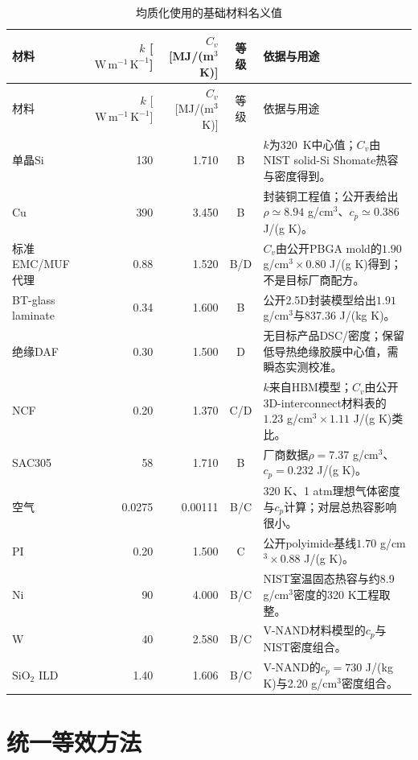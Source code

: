 \documentclass[UTF8,zihao=-4]{ctexart}
\newcommand{\unitk}{\mathrm{W\,m^{-1}\,K^{-1}}}
\begin{document}
\begingroup
\small
\setlength{\tabcolsep}{3pt}
\begin{longtable}{@{}p{2.2cm}rrcp{6.8cm}@{}}
\caption{均质化使用的基础材料名义值}\label{tab:base-materials}\\
\toprule
材料 & $k$ [$\unitk$] & $C_v$ [MJ/(m$^3$K)] & 等级 & 依据与用途 \\
\midrule
\endfirsthead
\toprule
材料 & $k$ [$\unitk$] & $C_v$ [MJ/(m$^3$K)] & 等级 & 依据与用途 \\
\midrule
\endhead
\bottomrule
\endfoot
单晶Si & 130 & 1.710 & B & $k$为\SI{320}{\kelvin}中心值；$C_v$由NIST solid-Si Shomate热容与密度得到\cite{NISTSiliconCp}。\\
Cu & 390 & 3.450 & B & 封装铜工程值；公开表给出$\rho\simeq8.94$ g/cm$^3$、$c_p\simeq0.386$ J/(g K)\cite{Khan2012}。\\
标准EMC/MUF代理 & 0.88 & 1.520 & B/D & $C_v$由公开PBGA mold的$1.90$ g/cm$^3\times0.80$ J/(g K)得到\cite{LiLyu2021}；不是目标厂商配方。\\
BT-glass laminate & 0.34 & 1.600 & B & 公开2.5D封装模型给出$1.91$ g/cm$^3$与837.36 J/(kg K)\cite{MaYuWang2014}。\\
绝缘DAF & 0.30 & 1.500 & D & 无目标产品DSC/密度；保留低导热绝缘胶膜中心值，需瞬态实测校准。\\
NCF & 0.20 & 1.370 & C/D & $k$来自HBM模型；$C_v$由公开3D-interconnect材料表的$1.23$ g/cm$^3\times1.11$ J/(g K)类比\cite{Khan2012}。\\
SAC305 & 58 & 1.710 & B & 厂商数据$\rho=7.37$ g/cm$^3$、$c_p=0.232$ J/(g K)\cite{MacDermidSAC305}。\\
空气 & 0.0275 & 0.00111 & B/C & 320 K、1 atm理想气体密度与$c_p$计算；对层总热容影响很小。\\
PI & 0.20 & 1.500 & C & 公开polyimide基线$1.70$ g/cm$^3\times0.88$ J/(g K)\cite{LiLyu2021}。\\
Ni & 90 & 4.000 & B/C & NIST室温固态热容与约8.9 g/cm$^3$密度的320 K工程取整。\\
W & 40 & 2.580 & B/C & V-NAND材料模型的$c_p$与NIST密度组合\cite{KimRyuLee2025}。\\
SiO$_2$ ILD & 1.40 & 1.606 & B/C & V-NAND的$c_p=730$ J/(kg K)与2.20 g/cm$^3$密度组合\cite{KimRyuLee2025}。\\
\end{longtable}
\endgroup

\section{统一等效方法}
\end{document}
